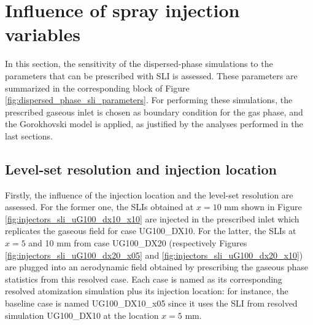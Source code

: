 \clearpage

\section{Influence of spray injection variables}
\label{sec:effect_of_SLI_variables}

In this section, the sensitivity of the dispersed-phase simulations to the parameters that can be prescribed with SLI is assessed. These parameters are summarized in the corresponding block of Figure \ref{fig:dispersed_phase_sli_parameters}. For performing these simulations, the prescribed gaseous inlet is chosen as boundary condition for the gas phase, and the Gorokhovski model is applied, as justified by the analyses performed in the last sections.


\subsection{Level-set resolution and injection location}
\label{subsec:SLI_LGS_resolution_and_injection_location}


Firstly, the influence of the injection location and the level-set resolution are assessed. For the former one, the SLIs obtained at $x = 10$ mm shown in Figure \ref{fig:injectors_sli_uG100_dx10_x10} are injected in the prescribed inlet which replicates the gaseous field for case UG100\_DX10. For the latter, the SLIs at $x = 5$ and 10 mm  from case UG100\_DX20 (respectively Figures \ref{fig:injectors_sli_uG100_dx20_x05} and \ref{fig:injectors_sli_uG100_dx20_x10}) are plugged into an aerodynamic field obtained by prescribing the gaseous phase statistics from this resolved case. Each case is named as its corresponding resolved atomization simulation plus its injection location: for instance, the baseline case is named UG100\_DX10\_x05 since it uses the SLI from resolved simulation UG100\_DX10 at the location $x = 5$ mm.


